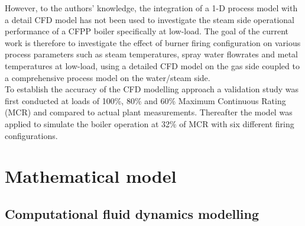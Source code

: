 \documentclass[twocolumn,10pt]{asme2ej}
\begin{document}
However, to the authors’ knowledge, the integration of a 1-D process model with a detail CFD model has not been used to investigate the steam side operational performance of a CFPP boiler specifically at low-load. The goal of the current work is therefore to investigate the effect of burner firing configuration on various process parameters such as steam temperatures, spray water flowrates and metal temperatures at low-load, using a detailed CFD model on the gas side coupled to a comprehensive process model on the water/steam side.\\

To establish the accuracy of the CFD modelling approach a validation study was first conducted at loads of 100\%, 80\% and 60\% Maximum Continuous Rating (MCR) and compared to actual plant measurements. Thereafter the model was applied to simulate the boiler operation at 32\% of MCR with six different firing configurations.

\section{Mathematical model}
\subsection{Computational fluid dynamics modelling}
\end{document}
